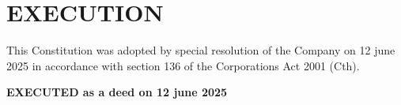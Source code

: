 \documentclass[12pt,a4paper]{article}
\begin{document}


















\newpage
\section*{EXECUTION}

This Constitution was adopted by special resolution of the Company on 12 june 2025 in accordance with section 136 of the Corporations Act 2001 (Cth).

\vspace{2cm}

\textbf{EXECUTED as a deed on 12 june 2025}

\vspace{3cm}
\end{document}
